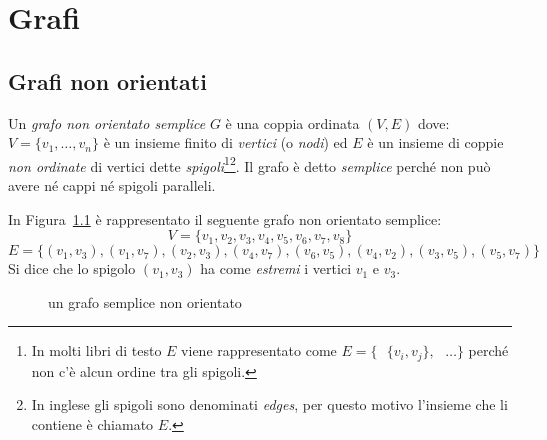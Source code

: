 \chapter{Grafi}

\section{Grafi non orientati}

\begin{defn}	
Un \emph{grafo non orientato semplice} $G$ è una coppia ordinata $(V,E)$ dove: $V=\{v_1,\dots,v_n\}$ è
un insieme finito di \emph{vertici} (o \emph{nodi}) ed $E$ è un insieme di coppie
\emph{non ordinate} di vertici dette \emph{spigoli}\footnote{ In molti libri di testo 
$E$ viene rappresentato come ${E = \{ \text{ } \{v_i,v_j\}, \text{ } \dots \}}$ perché non c'è
alcun ordine tra gli spigoli.}\footnote{In inglese gli spigoli sono denominati \emph{edges}, per
questo motivo l'insieme che li contiene è chiamato $E$.}. 
Il grafo è detto \emph{semplice} perché non può avere né cappi né spigoli paralleli.
\end{defn}

\begin{ese}
In Figura~\ref{fig:grf_semplice} è rappresentato il seguente grafo non orientato semplice:
\[V = \{ v_1, v_2, v_3, v_4, v_5, v_6, v_7, v_8 \}\]
\[E = \{ (v_1,v_3), (v_1,v_7), (v_2,v_3), (v_4,v_7),(v_6,v_5), (v_4,v_2), (v_3,v_5), (v_5,v_7) \}\]
Si dice che lo spigolo $(v_1,v_3)$ ha come \emph{estremi} i vertici $v_1$ e $v_3$.
\end{ese}
\begin{figure}[H]
    \centering
    \caption{un grafo semplice non orientato}
    \label{fig:grf_semplice}
\end{figure}

